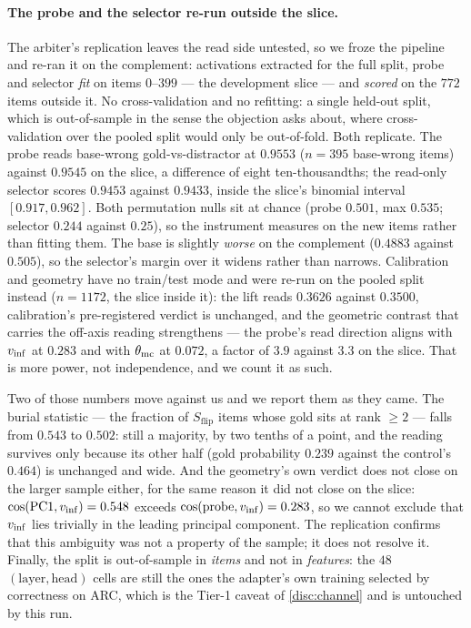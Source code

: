 \paragraph{The probe and the selector re-run outside the slice.}
The arbiter's replication leaves the read side untested, so we froze the pipeline and
re-ran it on the complement: activations extracted for the full split, probe and
selector \emph{fit} on items $0$--$399$ --- the development slice --- and \emph{scored}
on the $772$ items outside it. No cross-validation and no refitting: a single held-out
split, which is out-of-sample in the sense the objection asks about, where
cross-validation over the pooled split would only be out-of-fold. Both replicate. The
probe reads base-wrong gold-vs-distractor at $\mathbf{0.9553}$ ($n{=}395$ base-wrong
items) against $0.9545$ on the slice, a difference of eight ten-thousandths; the
read-only selector scores $\mathbf{0.9453}$ against $0.9433$, inside the slice's
binomial interval $[0.917, 0.962]$. Both permutation nulls sit at chance (probe
$0.501$, max $0.535$; selector $0.244$ against $0.25$), so the instrument measures on
the new items rather than fitting them. The base is slightly \emph{worse} on the
complement ($0.4883$ against $0.505$), so the selector's margin over it widens rather
than narrows. Calibration and geometry have no train/test mode and were re-run on the
pooled split instead ($n{=}1172$, the slice inside it): the lift reads $0.3626$ against
$0.3500$, calibration's pre-registered verdict is unchanged, and the geometric contrast
that carries the off-axis reading strengthens --- the probe's read direction aligns with
$v_{\mathrm{inf}}$ at $0.283$ and with $\theta_{\mathrm{mc}}$ at $0.072$, a factor of $3.9$ against $3.3$ on
the slice. That is more power, not independence, and we count it as such.

Two of those numbers move against us and we report them as they came. The burial
statistic --- the fraction of $S_{\mathrm{flip}}$ items whose gold sits at rank $\ge 2$
--- falls from $0.543$ to $\mathbf{0.502}$: still a majority, by two tenths of a point,
and the reading survives only because its other half (gold probability $0.239$ against
the control's $0.464$) is unchanged and wide. And the geometry's own verdict does not
close on the larger sample either, for the same reason it did not close on the slice:
$\cos(\mathrm{PC1}, v_{\mathrm{inf}}) = 0.548$ exceeds $\cos(\mathrm{probe}, v_{\mathrm{inf}}) = 0.283$, so
we cannot exclude that $v_{\mathrm{inf}}$ lies trivially in the leading principal component. The
replication confirms that this ambiguity was not a property of the sample; it does not
resolve it. Finally, the split is out-of-sample in \emph{items} and not in
\emph{features}: the $48$ $(\mathrm{layer}, \mathrm{head})$ cells are still the ones the
adapter's own training selected by correctness on ARC, which is the Tier-1 caveat of
\cref{disc:channel} and is untouched by this run.

